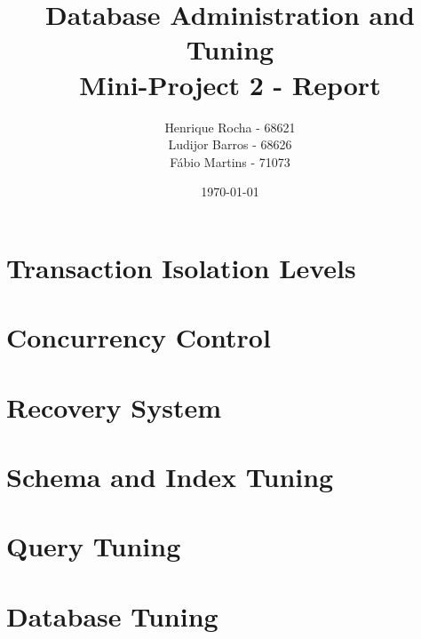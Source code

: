 \documentclass[11pt,report]{article}
\title{	Database Administration and Tuning \\ Mini-Project 2 - Report}
\author{
	Henrique Rocha - 68621 \\
	Ludijor Barros - 68626 \\
	Fábio Martins - 71073
}
\date{\today}
\begin{document}
	\maketitle
\section{Transaction Isolation Levels}

\section{Concurrency Control}

\section{Recovery System}

\section{Schema and Index Tuning}

\section{Query Tuning}
	
\section{Database Tuning}

\end{document}

